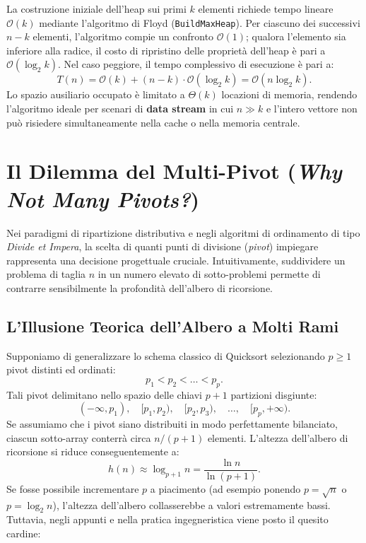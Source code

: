 \begin{property}
La costruzione iniziale dell'heap sui primi $k$ elementi richiede tempo lineare $\mathcal{O}(k)$ mediante l'algoritmo di Floyd (\texttt{BuildMaxHeap}). Per ciascuno dei successivi $n - k$ elementi, l'algoritmo compie un confronto $\mathcal{O}(1)$; qualora l'elemento sia inferiore alla radice, il costo di ripristino delle proprietà dell'heap è pari a $\mathcal{O}(\log_2 k)$. Nel caso peggiore, il tempo complessivo di esecuzione è pari a:
\begin{equation}
  T(n) = \mathcal{O}(k) + (n - k) \cdot \mathcal{O}(\log_2 k) = \mathcal{O}(n \log_2 k).
\end{equation}
Lo spazio ausiliario occupato è limitato a $\Theta(k)$ locazioni di memoria, rendendo l'algoritmo ideale per scenari di \textbf{data stream} in cui $n \gg k$ e l'intero vettore non può risiedere simultaneamente nella cache o nella memoria centrale.
\end{property}

\FloatBarrier
\section{Il Dilemma del Multi-Pivot (\textit{Why Not Many Pivots?})}
\label{sec:multi-pivot-dilemma}

Nei paradigmi di ripartizione distributiva e negli algoritmi di ordinamento di tipo \textit{Divide et Impera}, la scelta di quanti punti di divisione (\textit{pivot}) impiegare rappresenta una decisione progettuale cruciale. Intuitivamente, suddividere un problema di taglia $n$ in un numero elevato di sotto-problemi permette di contrarre sensibilmente la profondità dell'albero di ricorsione.

\subsection{L'Illusione Teorica dell'Albero a Molti Rami}
\label{subsec:tree-depth-illusion}

Supponiamo di generalizzare lo schema classico di Quicksort selezionando $p \ge 1$ pivot distinti ed ordinati:
\begin{equation}
  p_1 < p_2 < \dots < p_p.
\end{equation}
Tali pivot delimitano nello spazio delle chiavi $p + 1$ partizioni disgiunte:
\begin{equation}
  (-\infty, p_1), \quad [p_1, p_2), \quad [p_2, p_3), \quad \dots, \quad [p_p, +\infty).
\end{equation}
Se assumiamo che i pivot siano distribuiti in modo perfettamente bilanciato, ciascun sotto-array conterrà circa $n / (p + 1)$ elementi. L'altezza dell'albero di ricorsione si riduce conseguentemente a:
\begin{equation}
  h(n) \approx \log_{p+1} n = \frac{\ln n}{\ln(p + 1)}.
\end{equation}
Se fosse possibile incrementare $p$ a piacimento (ad esempio ponendo $p = \sqrt{n}$ o $p = \log_2 n$), l'altezza dell'albero collasserebbe a valori estremamente bassi. Tuttavia, negli appunti e nella pratica ingegneristica viene posto il quesito cardine:

